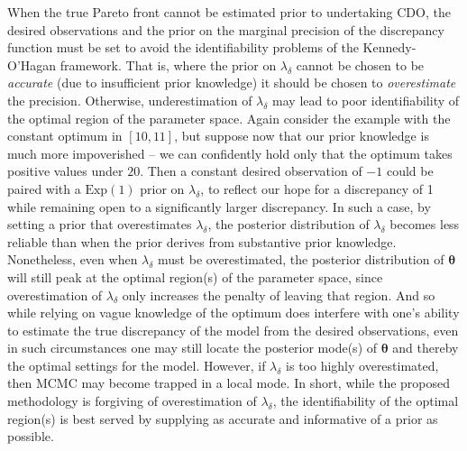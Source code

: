 \documentclass[12pt]{article}
\begin{document}
When the true Pareto front cannot be estimated prior to undertaking CDO, the desired observations and the prior on the marginal precision of the discrepancy function must be set to avoid the identifiability problems of the Kennedy-O'Hagan framework.
%
That is, where the prior on $\lambda_\delta$ cannot be chosen to be \emph{accurate} (due to insufficient prior knowledge) it should be chosen to \emph{overestimate} the precision.
%
Otherwise, underestimation of $\lambda_\delta$ may lead to poor identifiability of the optimal region of the parameter space.
%
Again consider the example with the constant optimum in $[10,11]$, but suppose now that our prior knowledge is much more impoverished -- we can confidently hold only that the optimum takes positive values under $20$. 
%
Then a constant desired observation of $-1$ could be paired with a $\mathrm{Exp}(1)$ prior on $\lambda_\delta$, to reflect our hope for a discrepancy of 1 while remaining open to a significantly larger discrepancy.
%
In such a case, by setting a prior that overestimates $\lambda_\delta$, the posterior distribution of $\lambda_\delta$ becomes less reliable than when the prior derives from substantive prior knowledge.
%
Nonetheless, even when $\lambda_\delta$ must be overestimated, the posterior distribution of $\boldsymbol \theta$ will still peak at the optimal region(s) of the parameter space, since overestimation of $\lambda_\delta$ only increases the penalty of leaving that region.
%
And so while relying on vague knowledge of the optimum does interfere with one's ability to estimate the true discrepancy of the model from the desired observations, even in such circumstances one may still locate the posterior mode(s) of $\boldsymbol \theta$ and thereby the optimal settings for the model.
%
However, if $\lambda_\delta$ is too highly overestimated, then MCMC may become trapped in a local mode. 
%
In short, while the proposed methodology is forgiving of overestimation of $\lambda_\delta$, the identifiability of the optimal region(s) is best served by supplying as accurate and informative of a prior as possible. 
\end{document}
